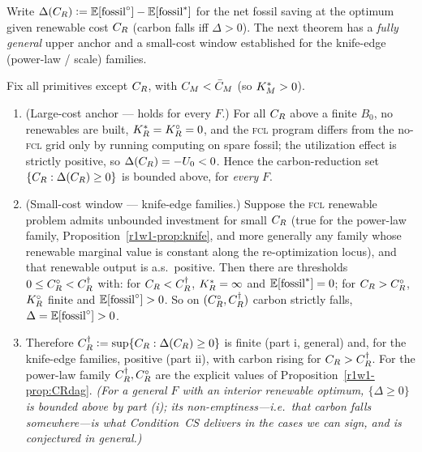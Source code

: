 Write $\Delta(C_R)\vcentcolon=\mathbb{E}[\text{fossil}^{\circ}]-\mathbb{E}[\text{fossil}^{*}]$ for the
net fossil saving at the optimum given renewable cost $C_R$ (carbon falls iff
$\Delta>0$). The next theorem has a \emph{fully general} upper anchor and a
small-cost window established for the knife-edge (power-law / scale) families.

\begin{theorem}\label{r1w1-thm:carbon}
Fix all primitives except $C_R$, with $C_M<\bar C_M$ (so $K_M^{*}>0$).
\begin{enumerate}[label=(\roman*),leftmargin=2.2em]
  \item \textup{(Large-cost anchor --- holds for every $F$.)} For all $C_R$ above a
        finite $B_0$, no renewables are built, $K_R^{*}=K_R^{\circ}=0$, and the \textsc{fcl}
        program differs from the no-\textsc{fcl} grid only by running computing on
        spare fossil; the utilization effect is strictly positive, so
        $\Delta(C_R)=-U_0<0$. Hence the carbon-reduction set $\{C_R:\Delta(C_R)\ge0\}$
        is bounded above, for \emph{every} $F$.
  \item \textup{(Small-cost window --- knife-edge families.)} Suppose the
        \textsc{fcl} renewable problem admits unbounded investment for small $C_R$
        (true for the power-law family, Proposition~\ref{r1w1-prop:knife}, and more
        generally any family whose renewable marginal value is constant along the
        re-optimization locus), and that renewable output is a.s.\ positive. Then
        there are thresholds $0\le C_R^{\circ}<C_R^{\dagger}$ with: for
        $C_R<C_R^{\dagger}$, $K_R^{*}=\infty$ and $\mathbb{E}[\text{fossil}^{*}]=0$; for
        $C_R>C_R^{\circ}$, $K_R^{\circ}$ finite and $\mathbb{E}[\text{fossil}^{\circ}]>0$. So on
        $(C_R^{\circ},C_R^{\dagger})$ carbon strictly falls,
        $\Delta=\mathbb{E}[\text{fossil}^{\circ}]>0$.
  \item Therefore $C_R^{\dagger}\vcentcolon=\sup\{C_R:\Delta(C_R)\ge0\}$ is finite (part
        i, general) and, for the knife-edge families, positive (part ii), with
        carbon rising for $C_R>C_R^{\dagger}$. For the power-law family
        $C_R^{\dagger},C_R^{\circ}$ are the explicit values of
        Proposition~\ref{r1w1-prop:CRdag}. \emph{(For a general $F$ with an interior
        renewable optimum, $\{\Delta\ge0\}$ is bounded above by part (i); its
        non-emptiness---i.e.\ that carbon falls somewhere---is what Condition~CS
        delivers in the cases we can sign, and is conjectured in general.)}
\end{enumerate}
\end{theorem}


